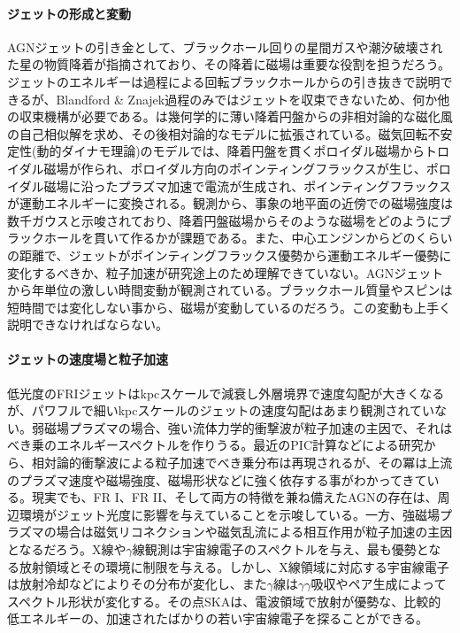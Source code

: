 \paragraph{ジェットの形成と変動}

AGNジェットの引き金として、ブラックホール回りの星間ガスや潮汐破壊された星の物質降着が指摘されており、その降着に磁場は重要な役割を担うだろう。ジェットのエネルギーは\cite{1977MNRAS.179..433B}過程による回転ブラックホールからの引き抜きで説明できるが、Blandford \& Znajek過程のみではジェットを収束できないため、何か他の収束機構が必要である。\cite{1982MNRAS.199..883B}は幾何学的に薄い降着円盤からの非相対論的な磁化風の自己相似解を求め、その後相対論的なモデルに拡張されている。磁気回転不安定性(動的ダイナモ理論)のモデル\citep{1991ApJ...376..214B}では、降着円盤を貫くポロイダル磁場からトロイダル磁場が作られ、ポロイダル方向のポインティングフラックスが生じ、ポロイダル磁場に沿ったプラズマ加速で電流が生成され、ポインティングフラックスが運動エネルギーに変換される。観測から、事象の地平面の近傍での磁場強度は数千ガウスと示唆されており、降着円盤磁場からそのような磁場をどのようにブラックホールを貫いて作るかが課題である。また、中心エンジンからどのくらいの距離で、ジェットがポインティングフラックス優勢から運動エネルギー優勢に変化するべきか、粒子加速が研究途上のため理解できていない。AGNジェットから年単位の激しい時間変動が観測されている。ブラックホール質量やスピンは短時間では変化しない事から、磁場が変動しているのだろう。この変動も上手く説明できなければならない。

\paragraph{ジェットの速度場と粒子加速}

低光度のFRIジェットはkpcスケールで減衰し外層境界で速度勾配が大きくなるが、パワフルで細いkpcスケールのジェットの速度勾配はあまり観測されていない。弱磁場プラズマの場合、強い流体力学的衝撃波が粒子加速の主因で、それはべき乗のエネルギースペクトルを作りうる。最近のPIC計算などによる研究から、相対論的衝撃波による粒子加速でべき乗分布は再現されるが、その冪は上流のプラズマ速度や磁場強度、磁場形状などに強く依存する事がわかってきている。現実でも、FR I、FR II、そして両方の特徴を兼ね備えたAGNの存在は、周辺環境がジェット光度に影響を与えていることを示唆している。一方、強磁場プラズマの場合は磁気リコネクションや磁気乱流による相互作用が粒子加速の主因となるだろう。X線や$\gamma$線観測は宇宙線電子のスペクトルを与え、最も優勢となる放射領域とその環境に制限を与える。しかし、X線領域に対応する宇宙線電子は放射冷却などによりその分布が変化し、また$\gamma$線は$\gamma \gamma$吸収やペア生成によってスペクトル形状が変化する。その点SKAは、電波領域で放射が優勢な、比較的低エネルギーの、加速されたばかりの若い宇宙線電子を探ることができる。


